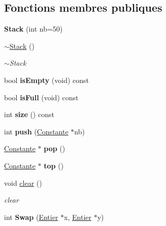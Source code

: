\subsection*{Fonctions membres publiques}
\begin{DoxyCompactItemize}
\item 
\hypertarget{class_stack_a8cf5d6fd8d89b6edbf64da16e3206a56}{{\bfseries Stack} (int nb=50)}\label{class_stack_a8cf5d6fd8d89b6edbf64da16e3206a56}

\item 
\hyperlink{class_stack_a40bd5dff912f0e5290777c4b46d17809}{$\sim$\-Stack} ()
\begin{DoxyCompactList}\small\item\em $\sim$\-Stack \end{DoxyCompactList}\item 
\hypertarget{class_stack_a51464b7aa2a497ebc751862120debbda}{bool {\bfseries is\-Empty} (void) const }\label{class_stack_a51464b7aa2a497ebc751862120debbda}

\item 
\hypertarget{class_stack_a83e4a6131725241f7919ea27b8ab812b}{bool {\bfseries is\-Full} (void) const }\label{class_stack_a83e4a6131725241f7919ea27b8ab812b}

\item 
\hypertarget{class_stack_ae53b3e26c5288bb1974693b1b2767a69}{int {\bfseries size} () const }\label{class_stack_ae53b3e26c5288bb1974693b1b2767a69}

\item 
\hypertarget{class_stack_a7248e17bcd1ffd2d0e7244fdcffc8f16}{int {\bfseries push} (\hyperlink{class_calcul_1_1_constante}{Constante} $\ast$nb)}\label{class_stack_a7248e17bcd1ffd2d0e7244fdcffc8f16}

\item 
\hypertarget{class_stack_ae3da45c6867f3bbafa276df693770b25}{\hyperlink{class_calcul_1_1_constante}{Constante} $\ast$ {\bfseries pop} ()}\label{class_stack_ae3da45c6867f3bbafa276df693770b25}

\item 
\hypertarget{class_stack_a8e025557db3b60c7770cfbc1891d0eba}{\hyperlink{class_calcul_1_1_constante}{Constante} $\ast$ {\bfseries top} ()}\label{class_stack_a8e025557db3b60c7770cfbc1891d0eba}

\item 
void \hyperlink{class_stack_adab1284b8929385d4020356fb52c8139}{clear} ()
\begin{DoxyCompactList}\small\item\em clear \end{DoxyCompactList}\item 
\hypertarget{class_stack_a96f913d70f6f5185d2782ac6ac5d787b}{int {\bfseries Swap} (\hyperlink{class_calcul_1_1_entier}{Entier} $\ast$x, \hyperlink{class_calcul_1_1_entier}{Entier} $\ast$y)}\label{class_stack_a96f913d70f6f5185d2782ac6ac5d787b}


\end{DoxyCompactItemize}
